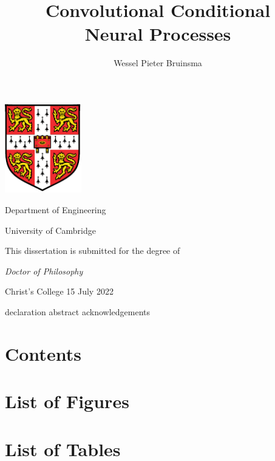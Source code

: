 \documentclass[12pt]{report}
\title{Convolutional Conditional \texorpdfstring{\\[0.5em]}{} Neural Processes}
\author{Wessel Pieter Bruinsma}
\begin{document}
\hypersetup{pageanchor=false}

\begin{titlepage}
    \makeatletter
    \centering

    \null
    {\bfseries\Huge \@title}

    \vfill
    \vspace{1cm}
    \includegraphics[width=0.25\textwidth]{resources/cambridge_crest.pdf}

    \vfill
    {\Large\bfseries \@author \par}
    {\large Department of Engineering\par}
    {\large University of Cambridge}

    \vfill
    {\large This dissertation is submitted for the degree of\par}
    {\large\itshape Doctor of Philosophy}

    \vfill
    {\large Christ's College \hfill 15 July 2022}

    \makeatother
\end{titlepage}

\null
\thispagestyle{empty}

{declaration}
{abstract}
{acknowledgements}

\chapter*{Contents}
\vspace{-16pt}  %
\makeatletter{}\makeatother

\chapter*{List of Figures}
\makeatletter{}\makeatother

\chapter*{List of Tables}
\makeatletter{}\makeatother
\end{document}
